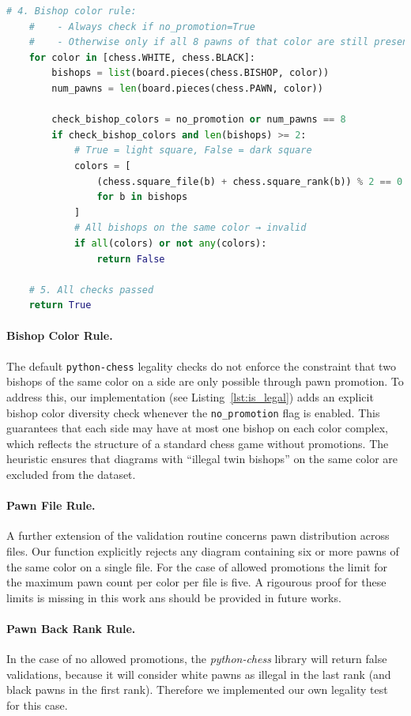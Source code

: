\documentclass[12pt]{article}
\begin{document}
\begin{lstlisting}[language=Python, caption={Validation of chess positions using python-chess}, label={lst:is_legal}]
    # 4. Bishop color rule:
    #    - Always check if no_promotion=True
    #    - Otherwise only if all 8 pawns of that color are still present
    for color in [chess.WHITE, chess.BLACK]:
        bishops = list(board.pieces(chess.BISHOP, color))
        num_pawns = len(board.pieces(chess.PAWN, color))

        check_bishop_colors = no_promotion or num_pawns == 8
        if check_bishop_colors and len(bishops) >= 2:
            # True = light square, False = dark square
            colors = [
                (chess.square_file(b) + chess.square_rank(b)) % 2 == 0
                for b in bishops
            ]
            # All bishops on the same color → invalid
            if all(colors) or not any(colors):
                return False

    # 5. All checks passed
    return True
\end{lstlisting}

\paragraph{Bishop Color Rule.}
The default \texttt{python-chess} legality checks do not enforce the constraint that two bishops of the same color on a side are only possible through pawn promotion. 
To address this, our implementation (see Listing~\ref{lst:is_legal}) adds an explicit bishop color diversity check whenever the \texttt{no\_promotion} flag is enabled. 
This guarantees that each side may have at most one bishop on each color complex, which reflects the structure of a standard chess game without promotions. 
The heuristic ensures that diagrams with ``illegal twin bishops'' on the same color are excluded from the dataset.

\paragraph{Pawn File Rule.}
A further extension of the validation routine concerns pawn distribution across files. 
Our function explicitly rejects any diagram containing six or more pawns of the same color on a single file. For the case of allowed promotions the limit for the maximum pawn count per color per file is five. A rigourous proof for these limits is missing in this work ans should be provided in future works.

\paragraph{Pawn Back Rank Rule.}
In the case of no allowed promotions, the \emph{python-chess} library will return false validations, because it will consider white pawns as illegal in the last rank (and black pawns in the first rank). Therefore we implemented our own legality test for this case.
\end{document}
